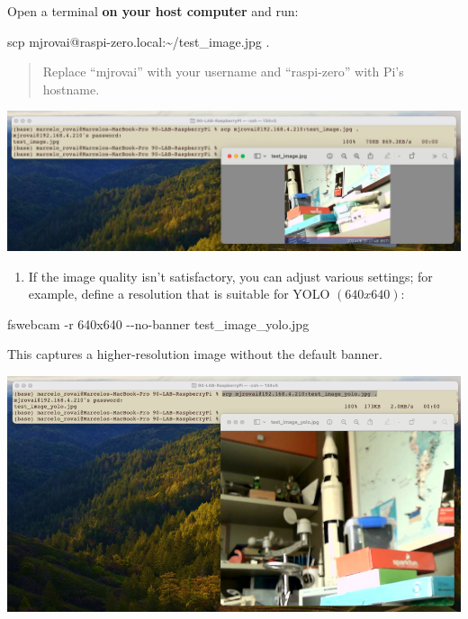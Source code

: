\documentclass[
]{article}
\newenvironment{Shaded}{\begin{snugshade}}{\end{snugshade}}
\newcommand{\AttributeTok}[1]{\textcolor[rgb]{0.40,0.45,0.13}{#1}}
\newcommand{\ExtensionTok}[1]{\textcolor[rgb]{0.00,0.23,0.31}{#1}}
\newcommand{\FunctionTok}[1]{\textcolor[rgb]{0.28,0.35,0.67}{#1}}
\newcommand{\NormalTok}[1]{\textcolor[rgb]{0.00,0.23,0.31}{#1}}
\providecommand{\tightlist}{%
  \setlength{\itemsep}{0pt}\setlength{\parskip}{0pt}}\usepackage{longtable,booktabs,array}
\begin{document}
Open a terminal \textbf{on your host computer} and run:

\begin{Shaded}
\begin{Highlighting}[]
\FunctionTok{scp}\NormalTok{ mjrovai@raspi{-}zero.local:\textasciitilde{}/test\_image.jpg .}
\end{Highlighting}
\end{Shaded}

\begin{quote}
Replace ``mjrovai'' with your username and ``raspi-zero'' with Pi's
hostname.
\end{quote}

\noindent \begin{center}
\includegraphics[width=0.8\linewidth,height=\textheight,keepaspectratio]{images/png/cam-2_test.png}
\end{center}

\begin{enumerate}
\def\labelenumi{\arabic{enumi}.}
\setcounter{enumi}{6}
\tightlist
\item
  If the image quality isn't satisfactory, you can adjust various
  settings; for example, define a resolution that is suitable for YOLO
  \((640x640)\):
\end{enumerate}

\begin{Shaded}
\begin{Highlighting}[]
\ExtensionTok{fswebcam} \AttributeTok{{-}r}\NormalTok{ 640x640 }\AttributeTok{{-}{-}no{-}banner}\NormalTok{ test\_image\_yolo.jpg}
\end{Highlighting}
\end{Shaded}

This captures a higher-resolution image without the default banner.

\noindent \begin{center}
\includegraphics[width=0.85\linewidth,height=\textheight,keepaspectratio]{images/png/usb-cam-test-2.png}
\end{center}
\end{document}
